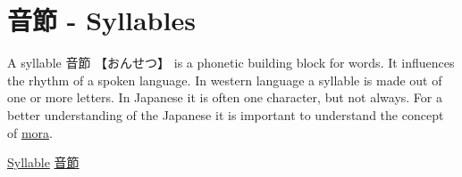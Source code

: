 \section{音節 - Syllables} \label{sec:Syllable}

A syllable {音節}  {【おんせつ】}  is a phonetic building block for words. It
influences the rhythm of a spoken language. In western language a syllable is
made out of one or more letters. In Japanese it is often one character, but not
always. For a better understanding of the Japanese it is important to
understand the concept of \hyperref[sec:Mora]{mora}.

\Link \href{http://en.wikipedia.org/wiki/Syllable}{Syllable}
\Link \href{http://ja.wikipedia.org/wiki/%E9%9F%B3%E7%AF%80}{音節}

